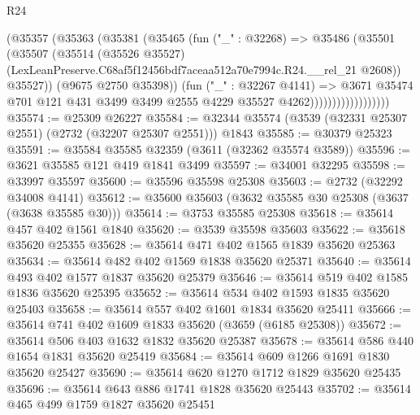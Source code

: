 \begin{lexlean}{R24}
\begin{coremodule}
                              (@35357
                                (@35363
                                  (@35381
                                    (@35465
                                      (fun ("_" : @32268) =>
                                      @35486
                                        (@35501
                                          (@35507
                                            (@35514
                                              (@35526 @35527)
                                              (LexLeanPreserve.C68af5f12456bdf7aceaa512a70e7994c.R24.__rel_21
                                                @2608))
                                            @35527))
                                        (@9675 @2750 @35398))
                                      (fun ("_" : @32267 @4141) =>
                                      @3671
                                        @35474
                                        @701
                                        @121
                                        @431
                                        @3499
                                        @3499
                                        @2555
                                        @4229
                                        @35527
                                        @4262))))))))))))))))))
@35574 := @25309 @26227
@35584 := @32344 @35574 (@3539 (@32331 @25307 @2551) (@2732 (@32207 @25307 @2551))) @1843
@35585 := @30379 @25323
@35591 := @35584 @35585 @32359 (@3611 (@32362 @35574 @3589))
@35596 := @3621 @35585 @121 @419 @1841 @3499
@35597 := @34001 @32295
@35598 := @33997 @35597
@35600 := @35596 @35598 @25308
@35603 := @2732 (@32292 @34008 @4141)
@35612 := @35600 @35603 (@3632 @35585 @30 @25308 (@3637 (@3638 @35585 @30)))
@35614 := @3753 @35585 @25308
@35618 := @35614 @457 @402 @1561 @1840
@35620 := @3539 @35598 @35603
@35622 := @35618 @35620 @25355
@35628 := @35614 @471 @402 @1565 @1839 @35620 @25363
@35634 := @35614 @482 @402 @1569 @1838 @35620 @25371
@35640 := @35614 @493 @402 @1577 @1837 @35620 @25379
@35646 := @35614 @519 @402 @1585 @1836 @35620 @25395
@35652 := @35614 @534 @402 @1593 @1835 @35620 @25403
@35658 := @35614 @557 @402 @1601 @1834 @35620 @25411
@35666 := @35614 @741 @402 @1609 @1833 @35620 (@3659 (@6185 @25308))
@35672 := @35614 @506 @403 @1632 @1832 @35620 @25387
@35678 := @35614 @586 @440 @1654 @1831 @35620 @25419
@35684 := @35614 @609 @1266 @1691 @1830 @35620 @25427
@35690 := @35614 @620 @1270 @1712 @1829 @35620 @25435
@35696 := @35614 @643 @886 @1741 @1828 @35620 @25443
@35702 := @35614 @465 @499 @1759 @1827 @35620 @25451

\end{coremodule}
\end{lexlean}
